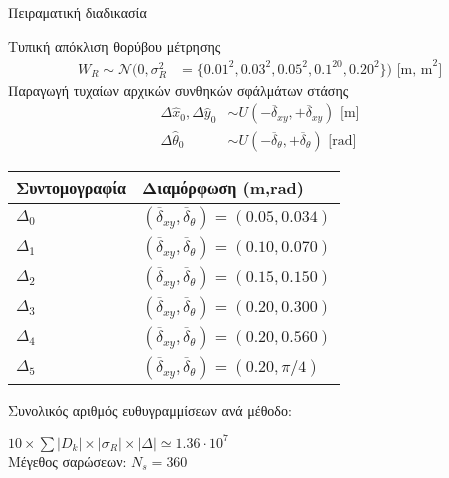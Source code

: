 \begin{frame}{Πειραματική διαδικασία}
{\begin{minipage}{\linewidth}
\begin{minipage}{0.56\linewidth}
\begin{bw_box}
        Τυπική απόκλιση θορύβου μέτρησης\vspace{-0.25cm}
      \begin{align}
        W_R \sim \mathcal{N}(0,\sigma_R^2 &= \{0.01^2, 0.03^2, 0.05^2, 0.1^20, 0.20^2\}) \text{ [m, m}^2] \nonumber
      \end{align}
        Παραγωγή τυχαίων αρχικών συνθηκών σφάλμάτων στάσης\vspace{-0.25cm}
      \begin{align}
        \Delta \hat{x}_0,\Delta \hat{y}_0     &\sim U(-\overline{\delta}_{xy},+\overline{\delta}_{xy}) \text{ [m]} \nonumber \\
        \Delta\hat{\theta}_0 &\sim U(-\overline{\delta}_{\theta},+\overline{\delta}_{\theta} )  \text{ [rad]}\nonumber
      \end{align}
        \vspace{-0.8cm}
      \begin{table}\centering
        \begin{tabular}{ll}
        Συντομογραφία         & Διαμόρφωση (m,rad)                                                      \\  \toprule
        $\Delta_0$            & $(\overline{\delta}_{xy}, \overline{\delta}_{\theta}) = (0.05, 0.034)$  \\
        $\Delta_1$            & $(\overline{\delta}_{xy}, \overline{\delta}_{\theta}) = (0.10, 0.070)$  \\
        $\Delta_2$            & $(\overline{\delta}_{xy}, \overline{\delta}_{\theta}) = (0.15, 0.150)$  \\
        $\Delta_3$            & $(\overline{\delta}_{xy}, \overline{\delta}_{\theta}) = (0.20, 0.300)$  \\
        $\Delta_4$            & $(\overline{\delta}_{xy}, \overline{\delta}_{\theta}) = (0.20, 0.560)$  \\
        $\Delta_5$            & $(\overline{\delta}_{xy}, \overline{\delta}_{\theta}) = (0.20, \pi/4)$  \\  \bottomrule
        \end{tabular}
      \end{table}

      Συνολικός αριθμός ευθυγραμμίσεων ανά μέθοδο:

      $10 \times \sum |D_k| \times |\sigma_R| \times |\Delta| \simeq 1.36 \cdot 10^7$\\

      Μέγεθος σαρώσεων: $N_s = 360$\\


\end{bw_box}
\end{minipage}
\end{minipage}}
\end{frame}
